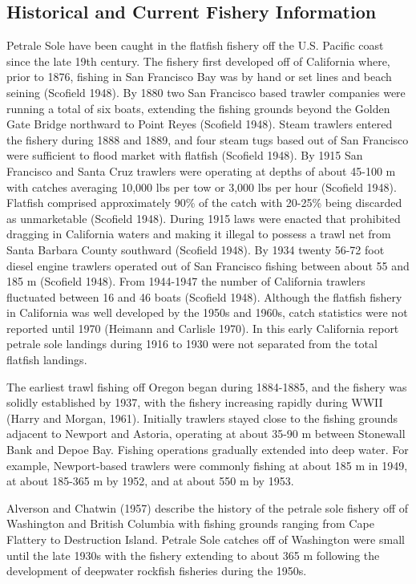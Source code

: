 \documentclass[11pt,
  english,
  letterpaper,
]{article}
\begin{document}
\hypertarget{historical-and-current-fishery-information}{%
\subsection{Historical and Current Fishery Information}\label{historical-and-current-fishery-information}}

Petrale Sole have been caught in the flatfish fishery off the U.S. Pacific coast since the late 19th century. The fishery first developed off of California where, prior to 1876, fishing in San Francisco Bay was by hand or set lines and beach seining (Scofield 1948). By 1880 two San Francisco based trawler companies were running a total of six boats, extending the fishing grounds beyond the Golden Gate Bridge northward to Point Reyes (Scofield 1948). Steam trawlers entered the fishery during 1888 and 1889, and four steam tugs based out of San Francisco were sufficient to flood market with flatfish (Scofield 1948). By 1915 San Francisco and Santa Cruz trawlers were operating at depths of about 45-100 m with catches averaging 10,000 lbs per tow or 3,000 lbs per hour (Scofield 1948). Flatfish comprised approximately 90\% of the catch with 20-25\% being discarded as unmarketable (Scofield 1948). During 1915 laws were enacted that prohibited dragging in California waters and making it illegal to possess a trawl net from Santa Barbara County southward (Scofield 1948). By 1934 twenty 56-72 foot diesel engine trawlers operated out of San Francisco fishing between about 55 and 185 m (Scofield 1948). From 1944-1947 the number of California trawlers fluctuated between 16 and 46 boats (Scofield 1948). Although the flatfish fishery in California was well developed by the 1950s and 1960s, catch statistics were not reported until 1970 (Heimann and Carlisle 1970). In this early California report petrale sole landings during 1916 to 1930 were not separated from the total flatfish landings.

The earliest trawl fishing off Oregon began during 1884-1885, and the fishery was solidly established by 1937, with the fishery increasing rapidly during WWII (Harry and Morgan, 1961). Initially trawlers stayed close to the fishing grounds adjacent to Newport and Astoria, operating at about 35-90 m between Stonewall Bank and Depoe Bay. Fishing operations gradually extended into deep water. For example, Newport-based trawlers were commonly fishing at about 185 m in 1949, at about 185-365 m by 1952, and at about 550 m by 1953.

Alverson and Chatwin (1957) describe the history of the petrale sole fishery off of Washington and British Columbia with fishing grounds ranging from Cape Flattery to Destruction Island. Petrale Sole catches off of Washington were small until the late 1930s with the fishery extending to about 365 m following the development of deepwater rockfish fisheries during the 1950s.
\end{document}
